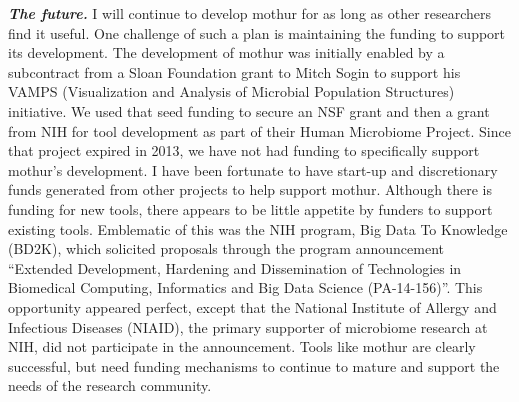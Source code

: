 \documentclass[11pt,]{article}
\begin{document}
\textbf{\emph{The future.}} I will continue to develop mothur for as
long as other researchers find it useful. One challenge of such a plan
is maintaining the funding to support its development. The development
of mothur was initially enabled by a subcontract from a Sloan Foundation
grant to Mitch Sogin to support his VAMPS (Visualization and Analysis of
Microbial Population Structures) initiative. We used that seed funding
to secure an NSF grant and then a grant from NIH for tool development as
part of their Human Microbiome Project. Since that project expired in
2013, we have not had funding to specifically support mothur's
development. I have been fortunate to have start-up and discretionary
funds generated from other projects to help support mothur. Although
there is funding for new tools, there appears to be little appetite by
funders to support existing tools. Emblematic of this was the NIH
program, Big Data To Knowledge (BD2K), which solicited proposals through
the program announcement ``Extended Development, Hardening and
Dissemination of Technologies in Biomedical Computing, Informatics and
Big Data Science (PA-14-156)''. This opportunity appeared perfect,
except that the National Institute of Allergy and Infectious Diseases
(NIAID), the primary supporter of microbiome research at NIH, did not
participate in the announcement. Tools like mothur are clearly
successful, but need funding mechanisms to continue to mature and
support the needs of the research community.
\end{document}

